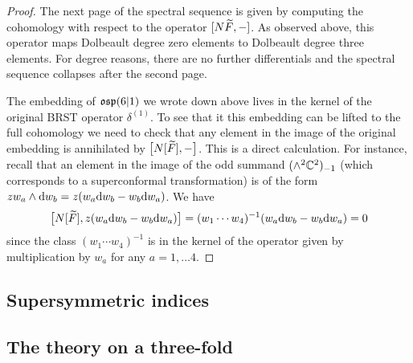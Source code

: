 \begin{proof}
The next page of the spectral sequence is given by computing the cohomology with respect to the operator $[N \widetilde F,-]$. 
As observed above, this operator maps Dolbeault degree zero elements to Dolbeault degree three elements. 
For degree reasons, there are no further differentials and the spectral sequence collapses after the second page. 

The embedding of $\mathfrak{osp}(6|1)$ we wrote down above lives in the kernel of the original BRST operator $\delta^{(1)}$. 
To see that it this embedding can be lifted to the full cohomology we need to check that any element in the image of the original embedding is annihilated by $\big[ N [\widetilde F] , - \big]$. 
This is a direct calculation. 
For instance, recall that an element in the image of the odd summand $(\wedge^2 \mathbb C^2)_{-1}$ (which corresponds to a superconformal transformation) is of the form $z w_a \wedge {\rm d} w_b = z(w_a {\rm d} w_b - w_b {\rm d} w_a)$. 
We have
\[
\big[ N [\widetilde F] , z(w_a {\rm d} w_b - w_b {\rm d} w_a) \big] = (w_1\cdots w_4)^{-1} (w_a {\rm d} w_b - w_b {\rm d} w_a) = 0
\]
since the class $(w_1\cdots w_4)^{-1}$ is in the kernel of the operator given by multiplication by $w_a$ for any $a = 1,\ldots 4$. 
\end{proof}
\subsection{Supersymmetric indices}


\subsection{The theory on a three-fold}
